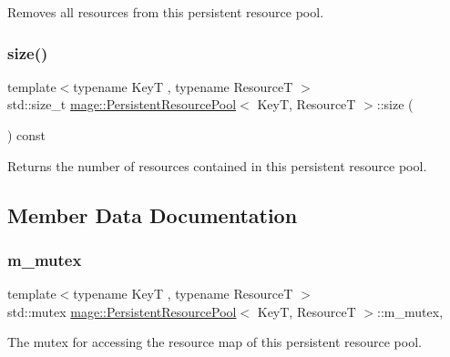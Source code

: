 Removes all resources from this persistent resource pool. \mbox{\label{classmage_1_1_persistent_resource_pool_a786d243e24879b8cbd62c7f902b3a41b}} 
\subsubsection{\texorpdfstring{size()}{size()}}
{\footnotesize\ttfamily template$<$typename KeyT , typename ResourceT $>$ \\
std\+::size\+\_\+t \mbox{\hyperlink{classmage_1_1_persistent_resource_pool}{mage\+::\+Persistent\+Resource\+Pool}}$<$ KeyT, ResourceT $>$\+::size (\begin{DoxyParamCaption}{ }\end{DoxyParamCaption}) const\hspace{0.3cm}{\ttfamily [noexcept]}}

Returns the number of resources contained in this persistent resource pool. 

\subsection{Member Data Documentation}
\mbox{\label{classmage_1_1_persistent_resource_pool_ac62c20842345306be0cddda2cb0d0524}} 
\subsubsection{\texorpdfstring{m\+\_\+mutex}{m\_mutex}}
{\footnotesize\ttfamily template$<$typename KeyT , typename ResourceT $>$ \\
std\+::mutex \mbox{\hyperlink{classmage_1_1_persistent_resource_pool}{mage\+::\+Persistent\+Resource\+Pool}}$<$ KeyT, ResourceT $>$\+::m\+\_\+mutex\hspace{0.3cm}{\ttfamily [mutable]}, {\ttfamily [private]}}

The mutex for accessing the resource map of this persistent resource pool. \mbox{\label{classmage_1_1_persistent_resource_pool_a9fec1e7492b5aea2a006b4e150289795}} 
